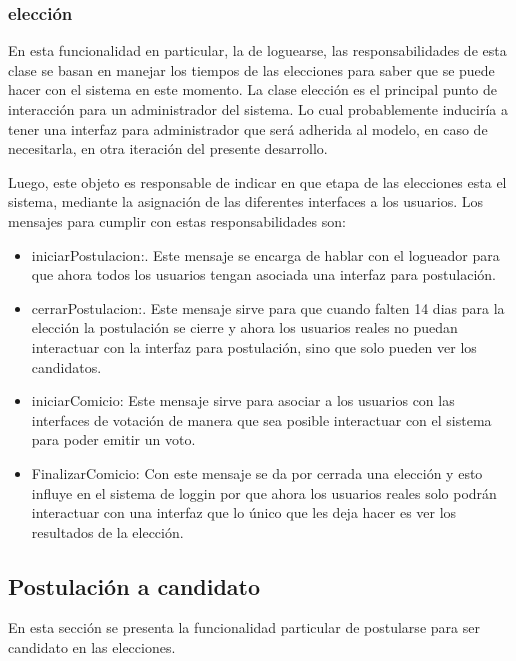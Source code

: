 \subsubsection{elecci\'on}

En esta funcionalidad en particular, la de loguearse, las responsabilidades de esta clase se basan en manejar los tiempos de las elecciones para saber que se puede hacer con el sistema en este momento. La clase elecci\'on es el principal punto de interacci\'on para un administrador del sistema. Lo cual probablemente inducir\'ia a tener una interfaz para administrador que ser\'a adherida al modelo, en caso de necesitarla, en otra iteraci\'on del presente desarrollo.

Luego, este objeto es responsable de indicar en que etapa de las elecciones esta el sistema, mediante la asignaci\'on de las diferentes interfaces a los usuarios. Los mensajes para cumplir con estas responsabilidades son:

\begin{itemize}
\item iniciarPostulacion:. Este mensaje se encarga de hablar con el logueador para que ahora todos los usuarios tengan asociada una interfaz para postulaci\'on.
\item cerrarPostulacion:. Este mensaje sirve para que cuando falten 14 dias para la elecci\'on la postulaci\'on se cierre y ahora los usuarios reales no puedan interactuar con la interfaz para postulaci\'on, sino que solo pueden ver los candidatos.
\item iniciarComicio: Este mensaje sirve para asociar a los usuarios con las interfaces de votaci\'on de manera que sea posible interactuar con el sistema para poder emitir un voto.
\item FinalizarComicio: Con este mensaje se da por cerrada una elecci\'on y esto influye en el sistema de loggin por que ahora los usuarios reales solo podr\'an interactuar con una interfaz que lo \'unico que les deja hacer es ver los resultados de la elecci\'on. 
\end{itemize}




\subsection{Postulaci\'on a candidato}

En esta secci\'on se presenta la funcionalidad particular de postularse para ser candidato en las elecciones.



